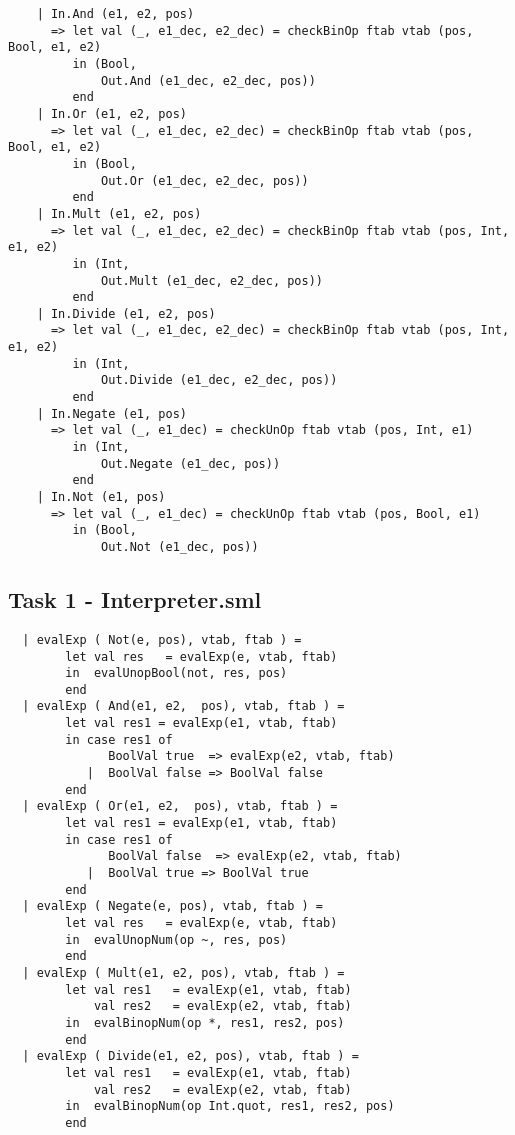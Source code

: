 \documentclass{article}
\begin{document}
\begin{verbatim}
    | In.And (e1, e2, pos)
      => let val (_, e1_dec, e2_dec) = checkBinOp ftab vtab (pos, Bool, e1, e2)
         in (Bool,
             Out.And (e1_dec, e2_dec, pos))
         end
    | In.Or (e1, e2, pos)
      => let val (_, e1_dec, e2_dec) = checkBinOp ftab vtab (pos, Bool, e1, e2)
         in (Bool,
             Out.Or (e1_dec, e2_dec, pos))
         end
    | In.Mult (e1, e2, pos)
      => let val (_, e1_dec, e2_dec) = checkBinOp ftab vtab (pos, Int, e1, e2)
         in (Int,
             Out.Mult (e1_dec, e2_dec, pos))
         end
    | In.Divide (e1, e2, pos)
      => let val (_, e1_dec, e2_dec) = checkBinOp ftab vtab (pos, Int, e1, e2)
         in (Int,
             Out.Divide (e1_dec, e2_dec, pos))
         end
    | In.Negate (e1, pos)
      => let val (_, e1_dec) = checkUnOp ftab vtab (pos, Int, e1)
         in (Int,
             Out.Negate (e1_dec, pos))
         end
    | In.Not (e1, pos)
      => let val (_, e1_dec) = checkUnOp ftab vtab (pos, Bool, e1)
         in (Bool,
             Out.Not (e1_dec, pos))
\end{verbatim}

\subsection{Task 1 - Interpreter.sml}\label{app:1inter}
\begin{verbatim}
  | evalExp ( Not(e, pos), vtab, ftab ) =
        let val res   = evalExp(e, vtab, ftab)
        in  evalUnopBool(not, res, pos)
        end
  | evalExp ( And(e1, e2,  pos), vtab, ftab ) =
        let val res1 = evalExp(e1, vtab, ftab)
        in case res1 of
              BoolVal true  => evalExp(e2, vtab, ftab)
           |  BoolVal false => BoolVal false
        end
  | evalExp ( Or(e1, e2,  pos), vtab, ftab ) =
        let val res1 = evalExp(e1, vtab, ftab)
        in case res1 of
              BoolVal false  => evalExp(e2, vtab, ftab)
           |  BoolVal true => BoolVal true
        end
  | evalExp ( Negate(e, pos), vtab, ftab ) =
        let val res   = evalExp(e, vtab, ftab)
        in  evalUnopNum(op ~, res, pos)
        end
  | evalExp ( Mult(e1, e2, pos), vtab, ftab ) =
        let val res1   = evalExp(e1, vtab, ftab)
            val res2   = evalExp(e2, vtab, ftab)
        in  evalBinopNum(op *, res1, res2, pos)
        end
  | evalExp ( Divide(e1, e2, pos), vtab, ftab ) =
        let val res1   = evalExp(e1, vtab, ftab)
            val res2   = evalExp(e2, vtab, ftab)
        in  evalBinopNum(op Int.quot, res1, res2, pos)
        end
\end{verbatim}
\end{document}
